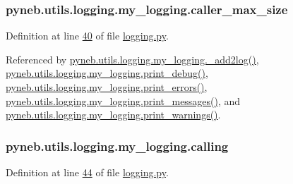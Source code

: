 \hypertarget{classpyneb_1_1utils_1_1logging_1_1my__logging_a0449825f771bc794da88ba49666726d5}{
\subsubsection[{caller\-\_\-max\-\_\-size}]{\setlength{\rightskip}{0pt plus 5cm}pyneb.\-utils.\-logging.\-my\-\_\-logging.\-caller\-\_\-max\-\_\-size}}\label{classpyneb_1_1utils_1_1logging_1_1my__logging_a0449825f771bc794da88ba49666726d5}


Definition at line \hyperlink{logging_8py_source_l00040}{40} of file \hyperlink{logging_8py_source}{logging.\-py}.



Referenced by \hyperlink{logging_8py_source_l00059}{pyneb.\-utils.\-logging.\-my\-\_\-logging.\-\_\-add2log()}, \hyperlink{logging_8py_source_l00157}{pyneb.\-utils.\-logging.\-my\-\_\-logging.\-print\-\_\-debug()}, \hyperlink{logging_8py_source_l00149}{pyneb.\-utils.\-logging.\-my\-\_\-logging.\-print\-\_\-errors()}, \hyperlink{logging_8py_source_l00133}{pyneb.\-utils.\-logging.\-my\-\_\-logging.\-print\-\_\-messages()}, and \hyperlink{logging_8py_source_l00141}{pyneb.\-utils.\-logging.\-my\-\_\-logging.\-print\-\_\-warnings()}.

\hypertarget{classpyneb_1_1utils_1_1logging_1_1my__logging_a38735db2b351731f0fb79d4a0eb231ab}{
\subsubsection[{calling}]{\setlength{\rightskip}{0pt plus 5cm}pyneb.\-utils.\-logging.\-my\-\_\-logging.\-calling}}\label{classpyneb_1_1utils_1_1logging_1_1my__logging_a38735db2b351731f0fb79d4a0eb231ab}


Definition at line \hyperlink{logging_8py_source_l00044}{44} of file \hyperlink{logging_8py_source}{logging.\-py}.



